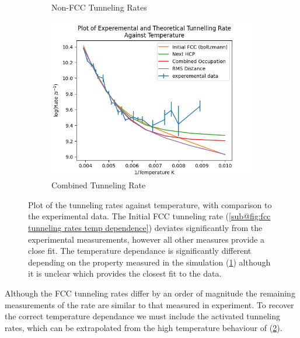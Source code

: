 \begin{figure}[htbp]
\begin{subfigure}{0.3\linewidth}
        \caption{Non-FCC Tunneling Rates
        }\label{sub@fig:other tunneling rates temp dependence}
    \end{subfigure}
    \hfill
    \begin{subfigure}{0.3\linewidth}
        \centering
        \includegraphics[width = 0.9\linewidth]{Figures/Redfield/Plot of redfield temperature dependance close points corrected.png}
        \caption{Combined Tunneling Rate
        }\label{sub@fig:rates with activated tunneling}
    \end{subfigure}
    \caption{Plot of the tunneling
        rates against temperature, with comparison
        to the experimental data.
        The Initial FCC tunneling rate
        (\cref{sub@fig:fcc tunneling rates temp dependence})
        deviates significantly from the experimental
        measurements, however all other measures
        provide a close fit.
        The temperature dependance
        is significantly different
        depending on the
        property measured
        in the simulation
        (\cref{sub@fig:other tunneling rates temp dependence})
        although it is unclear
        which provides the
        closest fit to the data.
    }\label{fig:tunneling rate against temperature}
\end{figure}
Although the FCC tunneling
rates differ by an order of
magnitude the remaining
measurements of the rate
are similar to that measured
in experiment. To recover the
correct temperature dependance
we must include
the activated tunneling rates, which
can be extrapolated from the
high temperature behaviour of
(\cref{sub@fig:rates with activated tunneling}).
